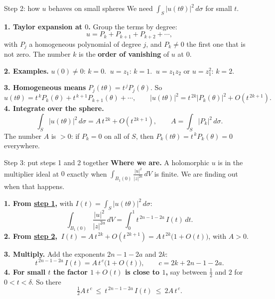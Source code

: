 \begin{frame}{Step 2: how \(u\) behaves on small spheres}
\label{fr:step-how-u-behaves-46}
We need \(\int_S|u(t\theta)|^2\,d\sigma\) for small \(t\).
\par
\textbf{1. Taylor expansion at \(0\).} Group the terms by degree:
\[
u=P_k+P_{k+1}+P_{k+2}+\cdots,
\]
with \(P_j\) a homogeneous polynomial of degree \(j\), and \(P_k\ne0\) the first one that is not zero. The number \(k\) is the \textbf{order of vanishing} of \(u\) at \(0\).
\par\smallskip
\textbf{2. Examples.} \(u(0)\ne0\): \(k=0\). \(\ u=z_1\): \(k=1\). \(\ u=z_1z_2\) or \(u=z_1^2\): \(k=2\).
\par\smallskip
\textbf{3. Homogeneous means} \(P_j(t\theta)=t^{\,j}P_j(\theta)\). So
\[
u(t\theta)=t^{\,k}P_k(\theta)+t^{\,k+1}P_{k+1}(\theta)+\cdots,
\qquad
|u(t\theta)|^2=t^{\,2k}|P_k(\theta)|^2+O(t^{\,2k+1}).
\]
\textbf{4. Integrate over the sphere.}
\[
\int_S|u(t\theta)|^2\,d\sigma=A\,t^{\,2k}+O(t^{\,2k+1}),
\qquad A=\int_S|P_k|^2\,d\sigma .
\]
The number \(A\) is \(>0\): if \(P_k=0\) on all of \(S\), then \(P_k(t\theta)=t^{\,k}P_k(\theta)=0\) everywhere.
\end{frame}

\begin{frame}{Step 3: put steps 1 and 2 together}
\label{fr:ex-step3}
\textbf{Where we are.} A holomorphic \(u\) is in the multiplier ideal at \(0\) exactly when \(\int_{B_1(0)}\frac{|u|^2}{|z|^{2a}}\,dV\) is finite. We are finding out when that happens.
\par\medskip
\textbf{1. From \hyperlink{fr:ex-step1-applied}{step 1},} with \(I(t)=\int_S|u(t\theta)|^2\,d\sigma\):
\[
\int_{B_1(0)}\frac{|u|^2}{|z|^{2a}}\,dV=\int_0^1t^{\,2n-1-2a}\,I(t)\,dt .
\]
\textbf{2. From \hyperlink{fr:step-how-u-behaves-46}{step 2},} \(\ I(t)=A\,t^{\,2k}+O(t^{\,2k+1})=A\,t^{\,2k}\bigl(1+O(t)\bigr)\), with \(A>0\).
\par\medskip
\textbf{3. Multiply.} Add the exponents \(2n-1-2a\) and \(2k\):
\[
t^{\,2n-1-2a}\,I(t)=A\,t^{\,c}\bigl(1+O(t)\bigr),
\qquad c=2k+2n-1-2a .
\]
\textbf{4. For small \(t\) the factor \(1+O(t)\) is close to \(1\),} say between \(\tfrac12\) and \(2\) for \(0<t<\delta\). So there
\[
\boxed{\tfrac12A\,t^{\,c}\ \le\ t^{\,2n-1-2a}\,I(t)\ \le\ 2A\,t^{\,c}.}
\]
\end{frame}

